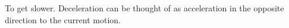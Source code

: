To get slower. Deceleration can be thought of as
acceleration in the opposite direction to the current 
motion.
